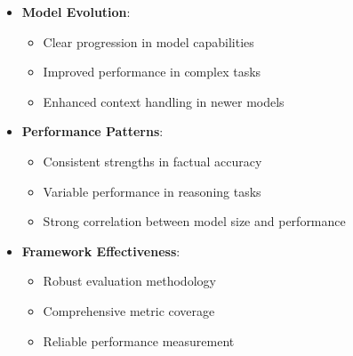 \begin{itemize}
    \item \textbf{Model Evolution}:
    \begin{itemize}
        \item Clear progression in model capabilities
        \item Improved performance in complex tasks
        \item Enhanced context handling in newer models
    \end{itemize}

    \item \textbf{Performance Patterns}:
    \begin{itemize}
        \item Consistent strengths in factual accuracy
        \item Variable performance in reasoning tasks
        \item Strong correlation between model size and performance
    \end{itemize}

    \item \textbf{Framework Effectiveness}:
    \begin{itemize}
        \item Robust evaluation methodology
        \item Comprehensive metric coverage
        \item Reliable performance measurement
    \end{itemize}
\end{itemize}
